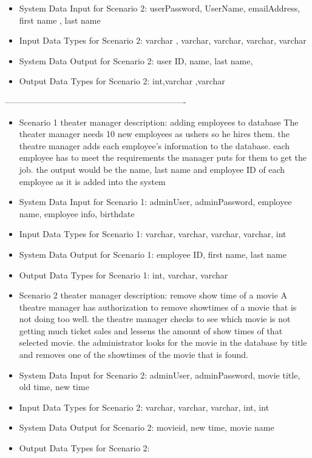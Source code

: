 {\begin{itemize}
\begin{itemize}
\begin{itemize}
	\item{System Data Input for Scenario 2: }
	userPassword, UserName, emailAddress,  first name , last name
	\item{Input Data Types for Scenario 2: }
	varchar , varchar, varchar, varchar, varchar
	\item{System Data Output for Scenario 2: }
	user ID, name, last name, 
	\item{Output Data Types for Scenario 2: }
	int,varchar ,varchar
	\end{itemize}
 	----------------------------------------------------------------
	\begin{itemize} 
	\item{Scenario 1 theater manager description: adding employees to database}
	The theater manager needs 10 new employees as ushers so he hires them. the theatre manager adds each employee's information to the database. each employee has to meet the requirements the manager puts for them to get the job. the output would be the name, last name and employee ID of each employee as it is added into the system
	\item{System Data Input for Scenario 1: }
	adminUser, adminPassword, employee name, employee info, birthdate
	\item{Input Data Types for Scenario 1: }
	varchar, varchar, varchar, varchar, int
	\item{System Data Output for Scenario 1: }
	employee ID, first name, last name
	\item{Output Data Types for Scenario 1: }
	int, varchar, varchar
	\end{itemize}
	\begin{itemize} 
	\item{Scenario 2 theater manager description: remove show time of a movie }
	A theatre manager has authorization to remove showtimes of a movie that is not doing too well. the theatre manager checks to see which movie is not getting much ticket sales and lessens the amount of show times of that selected movie. the administrator looks for the movie in the database by title and removes one of the showtimes of the movie that is found.
	\item{System Data Input for Scenario 2: }
	adminUser, adminPassword, movie title, old time, new time
	\item{Input Data Types for Scenario 2: }
	varchar, varchar, varchar, int, int
	\item{System Data Output for Scenario 2: }
	movieid, new time, movie name
	\item{Output Data Types for Scenario 2: }

\end{itemize}
\end{itemize}
\end{itemize}}
